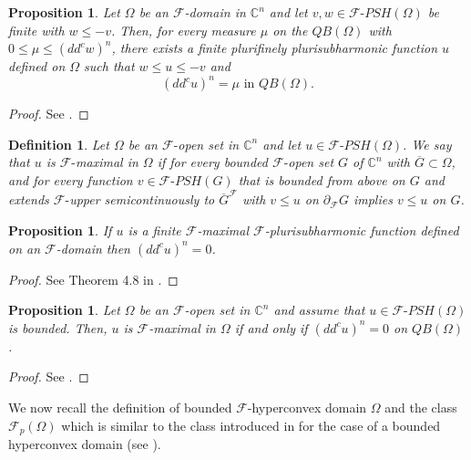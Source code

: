 \documentclass[3p,times]{elsarticle}
\numberwithin{equation}{section}
\newtheorem{proposition}[theorem]{Proposition}
\newtheorem{definition}[theorem]{Definition}
\newtheorem{The main theorem}[theorem]{The main theorem}
\theoremstyle{definition}
\def\f{\mathcal F\text{-}}
\begin{document}
\begin{proposition}
Let $\Omega$ be an $\mathcal F$-domain in $\mathbb C^n$ and let  $v,w\in \mathcal F\text{-}PSH(\Omega)$ be finite with  $w\leq -v$. 
Then, for every   measure $\mu$ on the  $QB(\Omega)$ with $0\leq \mu \leq (dd^c w)^n$, there exists a finite  plurifinely plurisubharmonic function $u$ defined on $\Omega$ such that   $w\leq u\leq -v$  and 
$$(dd^c u)^n =\mu \text{ in } QB(\Omega).$$
\end{proposition}
\begin{proof}
See \cite{Hong17}.
\end{proof}


\begin{definition}{\rm  Let $\Omega$ be an $\mathcal F \text{-}  $open set in $\mathbb C^n$ and let    $u\in \mathcal F \text{-}   PSH(\Omega)$.  We say that $u$  is $\mathcal F \text{-}  $maximal  in $\Omega$  if for every bounded $\mathcal F \text{-}  $open set $G$ of $\mathbb C^n$ with $\overline G\subset \Omega$, and for every function  $v\in \mathcal F \text{-}   PSH(G)$ that is bounded from above on $G$ and extends $\f$upper semicontinuously to $\overline{G}^{\mathcal F}$ with   $v\leq u$ on  $\partial_{\mathcal F} G$ implies   $v\leq u$ on $G$.  
}\end{definition}

\begin{proposition}
 If $u$ is  a finite $\mathcal F$-maximal $\mathcal F$-plurisubharmonic function defined  on an $\mathcal F$-domain then $(dd^c u)^n = 0$.
\end{proposition}
\begin{proof}
See Theorem 4.8 in \cite{KS14}.
\end{proof}


\begin{proposition}
Let $\Omega$ be an $\mathcal F$-open set in $\mathbb C^n$ and assume that $u\in \mathcal F \text{-} PSH(\Omega)$ is bounded. 
Then,  $u$ is  $\mathcal F$-maximal in $\Omega$
if and only if  $(dd^c u)^n =0$ on $QB(\Omega)$.
\end{proposition}
\begin{proof}
See  \cite{HHV17}.
\end{proof}


We now recall   the definition of bounded $\mathcal F$-hyperconvex domain $\Omega$ and the class $\mathcal F_p(\Omega)$  which is similar to the class introduced in \cite{Ce98} for the case  of a bounded hyperconvex domain (see \cite{TVH}).
\end{document}
